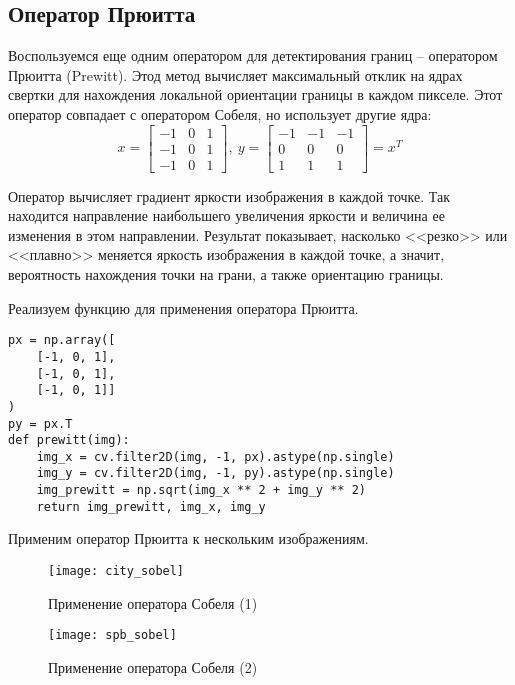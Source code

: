 \newpage

\subsection{Оператор Прюитта}

Воспользуемся еще одним оператором для детектирования границ -- оператором Прюитта (Prewitt). Этод метод вычисляет максимальный отклик на ядрах свертки для нахождения локальной ориентации границы в каждом пикселе. Этот оператор совпадает с оператором Собеля, но использует другие ядра:
$$
x = \begin{bmatrix}
-1 & 0 & 1 \\
-1 & 0 & 1 \\
-1 & 0 & 1
\end{bmatrix},\ 
y = \begin{bmatrix}
-1 & -1 & -1 \\
0  & 0  & 0 \\
1  & 1  & 1
\end{bmatrix} = x^T
$$

Оператор вычисляет градиент яркости изображения в каждой точке. Так находится направление наибольшего увеличения яркости и величина ее изменения в этом направлении. Результат показывает, насколько <<резко>> или <<плавно>> меняется яркость изображения в каждой точке, а значит, вероятность нахождения точки на грани, а также ориентацию границы.

Реализуем функцию для применения оператора Прюитта.

\begin{lstlisting}[caption={Применение оператора Собеля}]
px = np.array([
    [-1, 0, 1],
    [-1, 0, 1],
    [-1, 0, 1]]
)
py = px.T
def prewitt(img):
    img_x = cv.filter2D(img, -1, px).astype(np.single)
    img_y = cv.filter2D(img, -1, py).astype(np.single)
    img_prewitt = np.sqrt(img_x ** 2 + img_y ** 2)
    return img_prewitt, img_x, img_y
\end{lstlisting}

Применим оператор Прюитта к нескольким изображениям.

\begin{figure}[H]
	\centering
	\texttt{[image: city\_sobel]}
	\caption{Применение оператора Собеля (1)}
\end{figure}

\begin{figure}[H]
	\centering
	\texttt{[image: spb\_sobel]}
	\caption{Применение оператора Собеля (2)}
\end{figure}

